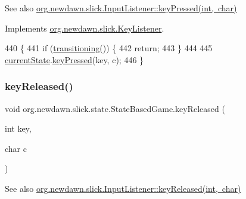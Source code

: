 \begin{DoxySeeAlso}{See also}
\mbox{\hyperlink{interfaceorg_1_1newdawn_1_1slick_1_1_key_listener_ac0b0568a21ef486c4f51382614c196ef}{org.\+newdawn.\+slick.\+Input\+Listener\+::key\+Pressed(int, char)}} 
\end{DoxySeeAlso}


Implements \mbox{\hyperlink{interfaceorg_1_1newdawn_1_1slick_1_1_key_listener_ac0b0568a21ef486c4f51382614c196ef}{org.\+newdawn.\+slick.\+Key\+Listener}}.


\begin{DoxyCode}
440                                             \{
441         \textcolor{keywordflow}{if} (\mbox{\hyperlink{classorg_1_1newdawn_1_1slick_1_1state_1_1_state_based_game_ae869c08778875776081935a090d4c92f}{transitioning}}()) \{
442             \textcolor{keywordflow}{return};
443         \}
444         
445         \mbox{\hyperlink{classorg_1_1newdawn_1_1slick_1_1state_1_1_state_based_game_a6a45e68094bb9b7ec30b8a8b7d415766}{currentState}}.\mbox{\hyperlink{interfaceorg_1_1newdawn_1_1slick_1_1_key_listener_ac0b0568a21ef486c4f51382614c196ef}{keyPressed}}(key, c);
446     \}
\end{DoxyCode}
\mbox{\label{classorg_1_1newdawn_1_1slick_1_1state_1_1_state_based_game_a5b246f61c1717c4e14ca066191f0350a}} 
\subsubsection{\texorpdfstring{key\+Released()}{keyReleased()}}
{\footnotesize\ttfamily void org.\+newdawn.\+slick.\+state.\+State\+Based\+Game.\+key\+Released (\begin{DoxyParamCaption}\item[{int}]{key,  }\item[{char}]{c }\end{DoxyParamCaption})\hspace{0.3cm}{\ttfamily [inline]}}

\begin{DoxySeeAlso}{See also}
\mbox{\hyperlink{interfaceorg_1_1newdawn_1_1slick_1_1_key_listener_a474673b59bc77266bcef3c261c26ee2b}{org.\+newdawn.\+slick.\+Input\+Listener\+::key\+Released(int, char)}} 
\end{DoxySeeAlso}


